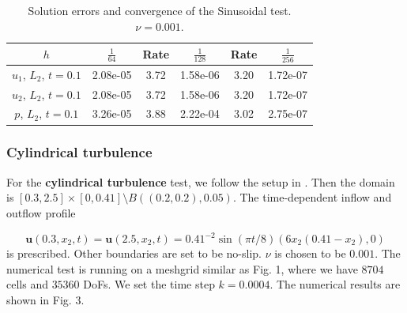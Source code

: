 \documentclass[lang=en,11pt,a4paper,bibend=bibtex]{elegantpaper}
\begin{document}
\begin{table}[H]
    \centering
    \begin{tabular}{cccccc}
    \hline
    $h$                                    & $\frac{1}{64}$ & 
    Rate & $\frac{1}{128}$ & Rate & $\frac{1}{256}$ \\ \hline
    $u_1$, $L_2$, $t=0.1$           & 2.08e-05   & 3.72 
    & 1.58e-06   & 3.20 & 1.72e-07    \\
    $u_2$, $L_2$, $t=0.1$           & 2.08e-05   & 3.72 
    & 1.58e-06   & 3.20 & 1.72e-07    \\ 
    $p$, $L_2$, $t=0.1$           & 3.26e-05   & 3.88 
    & 2.22e-04   & 3.02 & 2.75e-07    \\ \hline
    \end{tabular}
    \caption{Solution errors and convergence of the Sinusoidal test.
     $\nu=0.001$.}
\end{table}

\subsubsection{Cylindrical turbulence}

For the \textbf{cylindrical turbulence} test, we follow the setup
in \cite{Volker2004}. Then the domain is $[0.3,2.5]\times [0,0.41]
\setminus B((0.2,0.2),0.05)$. The time-dependent inflow and outflow
profile

\begin{equation}
    \mathbf{u}(0.3,x_2,t)=\mathbf{u}(2.5,x_2,t)=
    0.41^{-2}\sin(\pi t/8)(6x_2(0.41-x_2),0)
\end{equation}
is prescribed. Other boundaries are set to be no-slip.
$\nu$ is chosen to be $0.001$. The numerical test is
running on a meshgrid similar as Fig. 1, where we have $8704$ cells
and $35360$ DoFs. We set the time step $k=0.0004$. 
The numerical results are shown in Fig. 3. 
\end{document}
